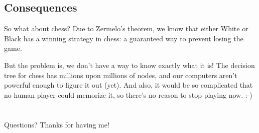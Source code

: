 \documentclass{beamer}
\theoremstyle{theorem}
\theoremstyle{definition}
\newcommand{\<}{\langle}
\renewcommand{\>}{\rangle}
\newcommand{\vpause}{\pause\vspace{1em}}
\begin{document}
\subsection{Consequences}

\begin{frame}{So what about chess?}
  Due to Zermelo's theorem, we know that either White or Black has a winning
  strategy in chess: a guaranteed way to prevent losing the game.

  \vpause

  But the problem is, we don't have a way to know exactly what it is! The
  decision tree for chess has millions upon millions of nodes, and our
  computers aren't powerful enough to figure it out (yet). And also, it would
  be so complicated that no human player could memorize it, so there's no
  reason to stop playing now. :-)


\end{frame}

\section*{}

\begin{frame}
Questions? Thanks for having me!
\end{frame}
\end{document}
